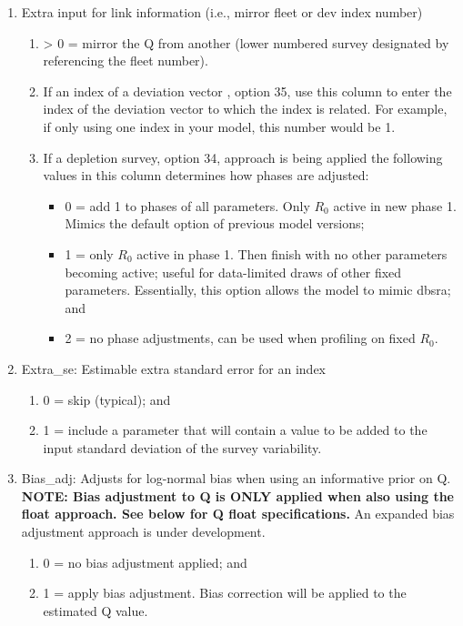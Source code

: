 \begin{enumerate}
\begin{enumerate}[label=(\alph*)]
	\end{enumerate}
	\item \hypertarget{link_info}{Extra input for link information (i.e., mirror fleet or dev index number)}
	\begin{enumerate}[label=(\alph*)]
		\item > 0 = mirror the Q from another (lower numbered survey designated by referencing the fleet number).
		\item If an index of a deviation vector , option 35, use this column to enter the index of the deviation vector to which the index is related. For example, if only using one index in your model, this number would be 1.
		\item If a depletion survey, option 34, approach is being applied the following values in this column determines how phases are adjusted:
		\begin{itemize}
			\item 0 = add 1 to phases of all parameters. Only $R_{0}$ active in new phase 1. Mimics the default option of previous model versions;
			\item 1 = only $R_{0}$ active in phase 1. Then finish with no other parameters becoming active; useful for data-limited draws of other fixed parameters. Essentially, this option allows the model to mimic \gls{dbsra}; and
			\item 2 = no phase adjustments, can be used when profiling on fixed $R_{0}$.
		\end{itemize}
	\end{enumerate}
	\item Extra\_se: Estimable extra standard error for an index
	\begin{enumerate}[label=(\alph*)]
		\item 0 = skip (typical); and
		\item 1 = include a parameter that will contain a value to be added to the input standard deviation of the survey variability.
	\end{enumerate}
	\item Bias\_adj: Adjusts for log-normal bias when using an informative prior on Q. \textbf{NOTE: Bias adjustment to Q is ONLY applied when also using the float approach. See below for Q float specifications.} An expanded bias adjustment approach is under development.
	\begin{enumerate}[label=(\alph*)]
		\item 0 = no bias adjustment applied; and
		\item 1 = apply bias adjustment. Bias correction will be applied to the estimated Q value.

\end{enumerate}
\end{enumerate}
